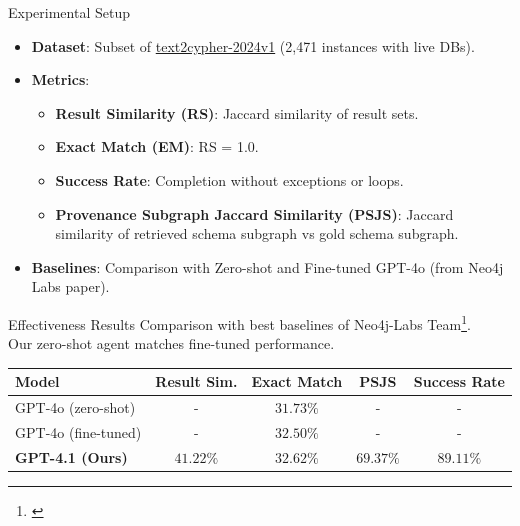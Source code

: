 \documentclass[aspectratio=169]{beamer}
\begin{document}
\begin{frame}{Experimental Setup}
    \begin{itemize}
        \item \textbf{Dataset}: Subset of \href{https://huggingface.co/datasets/neo4j/text2cypher-2024v1}{text2cypher-2024v1} (2,471 instances with live DBs).
        \item \textbf{Metrics}:
          \begin{itemize}
            \item \textbf{Result Similarity (RS)}: Jaccard similarity of result sets.
            \item \textbf{Exact Match (EM)}: RS = 1.0.
            \item \textbf{Success Rate}: Completion without exceptions or loops.
            \item \textbf{Provenance Subgraph Jaccard Similarity (PSJS)}: Jaccard similarity of retrieved schema subgraph vs gold schema subgraph.
          \end{itemize}
        \item \textbf{Baselines}: Comparison with Zero-shot and Fine-tuned GPT-4o (from Neo4j Labs paper).
    \end{itemize}
\end{frame}

\begin{frame}{Effectiveness Results}
  Comparison with best baselines of Neo4j-Labs Team\footnote{\cite{neo4jlabs-text2cypher-2024}}. \\
  Our zero-shot agent matches fine-tuned performance.
  \begin{table}
    \centering
    \begin{tabular}{lcccc}
        \hline
        Model & Result Sim. & Exact Match & PSJS & Success Rate \\
        \hline
        GPT-4o (zero-shot) & - & $31.73\%$ & - & - \\
        GPT-4o (fine-tuned) & - & $32.50\%$ & - & - \\
        \textbf{GPT-4.1 (Ours)}  & $\mathbf{41.22\%}$ & $\mathbf{32.62\%}$ & $\mathbf{69.37\%}$ & $89.11\%$ \\
        \hline
    \end{tabular}
  \end{table}
\end{frame}
\end{document}
